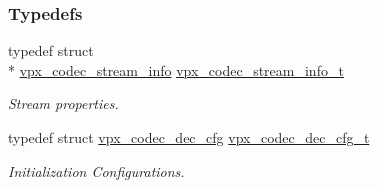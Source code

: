 \subsubsection*{Typedefs}
\begin{DoxyCompactItemize}
\item 
typedef struct \\*
\hyperlink{structvpx__codec__stream__info}{vpx\-\_\-codec\-\_\-stream\-\_\-info} \hyperlink{group__decoder_ga900420e8f7cb9c1b3070b2ba7d636974}{vpx\-\_\-codec\-\_\-stream\-\_\-info\-\_\-t}
\begin{DoxyCompactList}\small\item\em Stream properties. \end{DoxyCompactList}\item 
typedef struct \hyperlink{structvpx__codec__dec__cfg}{vpx\-\_\-codec\-\_\-dec\-\_\-cfg} \hyperlink{group__decoder_ga4a2e808eb43f1e798024b5a409c484f9}{vpx\-\_\-codec\-\_\-dec\-\_\-cfg\-\_\-t}
\begin{DoxyCompactList}\small\item\em Initialization Configurations. \end{DoxyCompactList}\end{DoxyCompactItemize}
